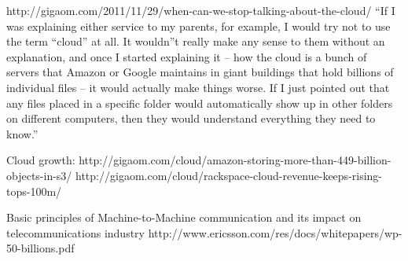 			http://gigaom.com/2011/11/29/when-can-we-stop-talking-about-the-cloud/
				``If I was explaining either service to my parents, for example, I would try not to use the term ``cloud'' at all. It wouldn''t really make any sense to them without an explanation, and once I started explaining it -- how the cloud is a bunch of servers that Amazon or Google maintains in giant buildings that hold billions of individual files -- it would actually make things worse. If I just pointed out that any files placed in a specific folder would automatically show up in other folders on different computers, then they would understand everything they need to know.''
			
			Cloud growth:
				http://gigaom.com/cloud/amazon-storing-more-than-449-billion-objects-in-s3/
				http://gigaom.com/cloud/rackspace-cloud-revenue-keeps-rising-tops-100m/
			
			Basic principles of Machine-to-Machine communication and its impact on telecommunications industry
				http://www.ericsson.com/res/docs/whitepapers/wp-50-billions.pdf
	
